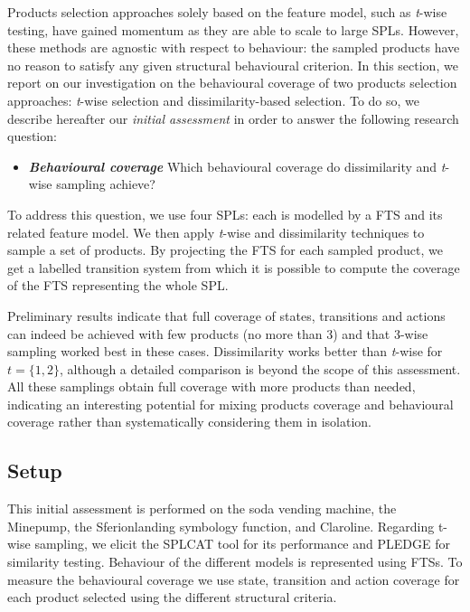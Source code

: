 \label{sec:experiment:beahviouralcoverage}

Products selection approaches solely based on the feature model, such as \textit{t}-wise testing, have gained momentum as they are able to scale to large SPLs. However, these methods are agnostic with respect to behaviour: the sampled products have no reason to satisfy any given structural behavioural criterion. In this section, we report on our investigation \cite{Devroey2015b} on the behavioural coverage of two products selection approaches: \textit{t}-wise selection and dissimilarity-based selection. To do so, we describe hereafter our \emph{initial assessment} in order to answer the following research question:
%
\begin{itemize}
\item  \textbf{\textit{Behavioural coverage} } Which behavioural coverage do dissimilarity and \textit{t}-wise sampling achieve?
\end{itemize} 
%
To address this question, we use four SPLs: each is modelled by a FTS and its related feature model. We then apply \textit{t}-wise and dissimilarity techniques to sample a set of products. By projecting the FTS for each sampled product, we get a 
labelled transition system from which it is possible to compute the coverage of the FTS representing the whole SPL.

Preliminary results indicate that full coverage of states, transitions and actions can indeed be achieved with few products (no more than 3) and that 3-wise sampling worked best in these cases. Dissimilarity works better than \textit{t}-wise for $t=\{1,2\}$, although a detailed comparison is beyond the scope of this assessment. All these samplings obtain full coverage with more products than needed, indicating an interesting potential for mixing products coverage and behavioural coverage rather than systematically considering them in isolation.

\subsection{Setup}

This initial assessment is performed on the soda vending machine, the Minepump, the Sferion\texttrademark landing symbology function, and Claroline.  Regarding t-wise sampling, we elicit the SPLCAT tool \cite{Johansen2012} for its performance \cite{Henard2014} and PLEDGE \cite{Henard2014a} for similarity testing. Behaviour of the different models is represented using FTSs. To measure the behavioural coverage we use state, transition and action coverage for each product selected using the different structural criteria. 

